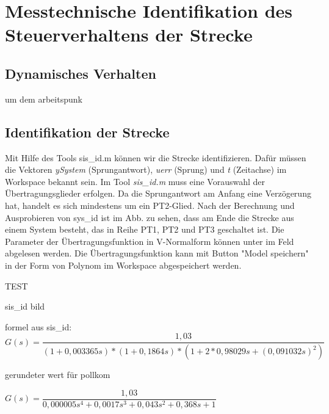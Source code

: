 








\newpage
[Perkowski]
\section{Messtechnische Identifikation des Steuerverhaltens der Strecke}


\subsection{Dynamisches Verhalten}
um dem arbeitspunk

\subsection{Identifikation der Strecke}
Mit Hilfe des Tools sis\_id.m können wir die Strecke identifizieren. Dafür müssen die Vektoren \textit{ySystem} (Sprungantwort), \textit{uerr} (Sprung) und \textit{t} (Zeitachse) im Workspace bekannt sein. Im Tool \textit{sis\_id.m} muss eine Vorauswahl der Übertragungsglieder erfolgen. Da die Sprungantwort am Anfang eine Verzögerung hat, handelt es sich mindestens um ein PT2-Glied. Nach der Berechnung und Ausprobieren von sys\_id ist im Abb. zu sehen, dass am Ende die Strecke aus einem System besteht, das in Reihe PT1, PT2 und PT3 geschaltet ist. Die Parameter der Übertragungsfunktion in V-Normalform können unter im Feld abgelesen werden. Die Übertragungsfunktion kann mit Button "Model speichern" in der Form von Polynom im Workspace abgespeichert werden.


TEST

sis\_id bild


formel aus sis\_id: \\

$ G(s) = \dfrac{1,03}{(1 + 0,003365s) * (1 + 0,1864s) * (1 + 2*0,98029s + (0,091032s)^{2}) }$

gerundeter wert für pollkom

$ G(s) =  \dfrac{1,03}{0,000005s^{4} + 0,0017s^{3	} + 0,043s^{2} + 0,368s + 1 } $